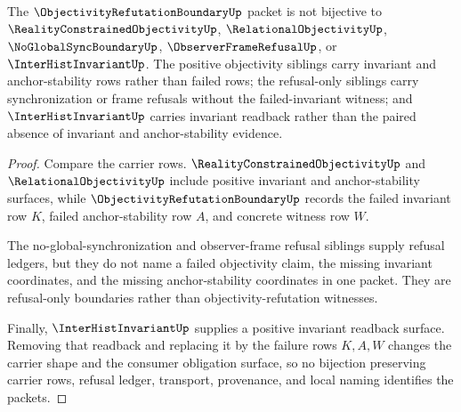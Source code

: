 \begin{theorem}
\label{thm:objectivity-refutation-boundary-sibling-independence}
The $\ObjectivityRefutationBoundaryUp$ packet is not bijective to $\RealityConstrainedObjectivityUp$, $\RelationalObjectivityUp$, $\NoGlobalSyncBoundaryUp$, $\ObserverFrameRefusalUp$, or $\InterHistInvariantUp$. The positive objectivity siblings carry invariant and anchor-stability rows rather than failed rows; the refusal-only siblings carry synchronization or frame refusals without the failed-invariant witness; and $\InterHistInvariantUp$ carries invariant readback rather than the paired absence of invariant and anchor-stability evidence.
\end{theorem}
\begin{proof}
Compare the carrier rows. $\RealityConstrainedObjectivityUp$ and $\RelationalObjectivityUp$ include positive invariant and anchor-stability surfaces, while $\ObjectivityRefutationBoundaryUp$ records the failed invariant row $K$, failed anchor-stability row $A$, and concrete witness row $W$.

The no-global-synchronization and observer-frame refusal siblings supply refusal ledgers, but they do not name a failed objectivity claim, the missing invariant coordinates, and the missing anchor-stability coordinates in one packet. They are refusal-only boundaries rather than objectivity-refutation witnesses.

Finally, $\InterHistInvariantUp$ supplies a positive invariant readback surface. Removing that readback and replacing it by the failure rows $K,A,W$ changes the carrier shape and the consumer obligation surface, so no bijection preserving carrier rows, refusal ledger, transport, provenance, and local naming identifies the packets.
\end{proof}



